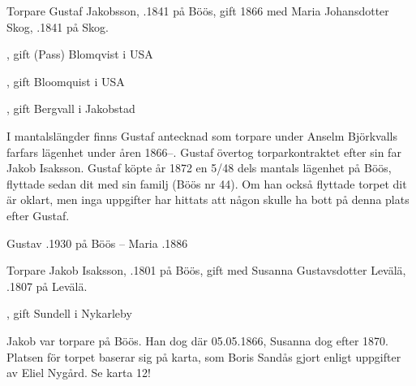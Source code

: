 Torpare Gustaf Jakobsson, .1841 på Böös, gift 1866 med Maria Johansdotter Skog, .1841 på Skog.
\begin{jhchildren}
  \item {}
  \item {}, gift (Pass) Blomqvist i USA
  \item {}
  \item {}
  \item {}, gift Bloomquist i USA
  \item {}
  \item {}
  \item {}, gift Bergvall i Jakobstad
\end{jhchildren}
I mantalslängder finns Gustaf antecknad som torpare under Anselm Björkvalls farfars lägenhet under åren 1866--. Gustaf övertog torparkontraktet efter sin far Jakob Isaksson. Gustaf köpte år 1872 en 5/48 dels mantals lägenhet på Böös, flyttade sedan dit med sin familj (Böös nr 44). Om han också flyttade torpet dit är oklart, men inga uppgifter har hittats att någon skulle ha bott på denna plats efter Gustaf.

Gustav .1930 på Böös  --  Maria .1886


Torpare Jakob Isaksson, .1801 på Böös, gift med Susanna Gustavsdotter Levälä, .1807 på Levälä.
\begin{jhchildren}
  \item {}, gift Sundell i Nykarleby
  \item {}
  \item {}
  \item {}
\end{jhchildren}
Jakob var torpare på Böös. Han dog där 05.05.1866, Susanna dog efter 1870. Platsen för torpet baserar sig på karta, som Boris Sandås gjort enligt uppgifter av Eliel Nygård. Se karta 12!
